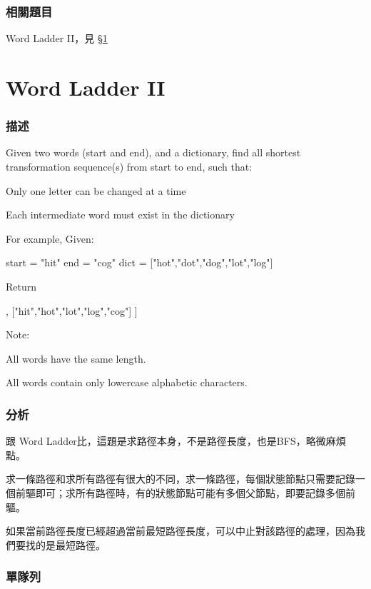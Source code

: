 \subsubsection{相關題目}

\begindot
\item Word Ladder II，見 \S \ref{sec:word-ladder-ii}
\myenddot


\section{Word Ladder II} %
\label{sec:word-ladder-ii}


\subsubsection{描述}
Given two words (start and end), and a dictionary, find all shortest transformation sequence(s) from start to end, such that:
\begindot
\item Only one letter can be changed at a time
\item Each intermediate word must exist in the dictionary
\myenddot

For example, Given:
\begin{Code}
start = "hit"
end = "cog"
dict = ["hot","dot","dog","lot","log"]
\end{Code}
Return
\begin{Code}
[
    ["hit","hot","dot","dog","cog"],
    ["hit","hot","lot","log","cog"]
]
\end{Code}

Note:
\begindot
\item All words have the same length.
\item All words contain only lowercase alphabetic characters.
\myenddot


\subsubsection{分析}
跟 Word Ladder比，這題是求路徑本身，不是路徑長度，也是BFS，略微麻煩點。

求一條路徑和求所有路徑有很大的不同，求一條路徑，每個狀態節點只需要記錄一個前驅即可；求所有路徑時，有的狀態節點可能有多個父節點，即要記錄多個前驅。

如果當前路徑長度已經超過當前最短路徑長度，可以中止對該路徑的處理，因為我們要找的是最短路徑。


\subsubsection{單隊列}

